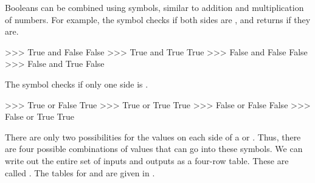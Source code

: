 Booleans can be combined using symbols, similar to addition and multiplication of numbers. For
example, the symbol  checks if both sides are , and returns  if they
are.

\begin{replbox}
>>> True and False
False
>>> True and True
True
>>> False and False
False
>>> False and True
False
\end{replbox}

The symbol  checks if only one side is .

\begin{replbox}
>>> True or False
True
>>> True or True
True
>>> False or False
False
>>> False or True
True
\end{replbox}

There are only two possibilities for the values on each side of a  or . Thus, there
are four possible combinations of values that can go into these symbols. We can write out the entire
set of inputs and outputs as a four-row table. These are called . The tables for
 and  are given in .

